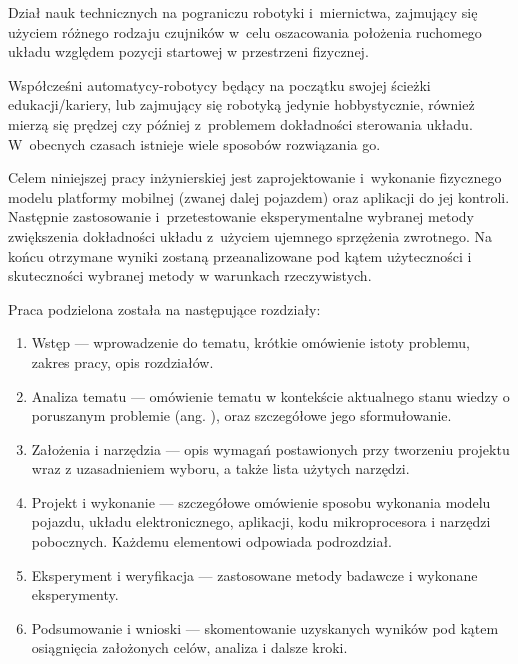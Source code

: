 \begin{Definition}[Odometria]\label{def:odometria}
    Dział nauk technicznych na pograniczu robotyki i~miernictwa, zajmujący się użyciem różnego rodzaju czujników w~celu oszacowania położenia ruchomego układu względem pozycji startowej w przestrzeni fizycznej.
\end{Definition}

Współcześni automatycy-robotycy będący na początku swojej ścieżki edukacji/kariery, lub zajmujący się robotyką jedynie hobbystycznie, również mierzą się prędzej czy później z~problemem dokładności sterowania układu. W~obecnych czasach istnieje wiele sposobów rozwiązania go.

Celem niniejszej pracy inżynierskiej jest zaprojektowanie i~wykonanie fizycznego modelu platformy mobilnej (zwanej dalej pojazdem) oraz aplikacji do jej kontroli. Następnie zastosowanie i~przetestowanie eksperymentalne wybranej metody zwiększenia dokładności układu z~użyciem ujemnego sprzężenia zwrotnego. Na końcu otrzymane wyniki zostaną przeanalizowane pod kątem użyteczności i skuteczności wybranej metody w warunkach rzeczywistych.

Praca podzielona została na następujące rozdziały\cite{bib:wymaganiapracy}:
\begin{enumerate}
    \item Wstęp --- wprowadzenie do tematu, krótkie omówienie istoty problemu, zakres pracy, opis rozdziałów.
    \item Analiza tematu --- omówienie tematu w kontekście aktualnego stanu wiedzy o poruszanym problemie (ang. ), oraz szczegółowe jego sformułowanie.
    \item Założenia i narzędzia --- opis wymagań postawionych przy tworzeniu projektu wraz z uzasadnieniem wyboru, a także lista użytych narzędzi.
    \item Projekt i wykonanie --- szczegółowe omówienie sposobu wykonania modelu pojazdu, układu elektronicznego, aplikacji, kodu mikroprocesora i narzędzi pobocznych. Każdemu elementowi odpowiada podrozdział.
    \item Eksperyment i weryfikacja --- zastosowane metody badawcze i wykonane eksperymenty.
    \item Podsumowanie i wnioski --- skomentowanie uzyskanych wyników pod kątem osiągnięcia założonych celów, analiza i dalsze kroki.
\end{enumerate}
